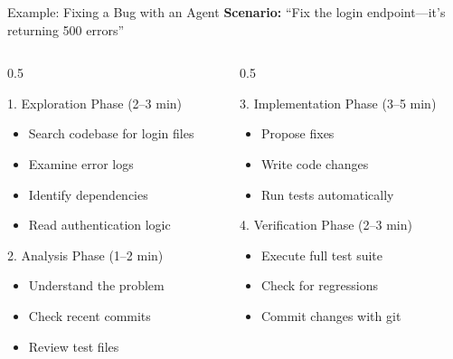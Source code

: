 \documentclass[aspectratio=169,11pt]{beamer}
\begin{document}
\begin{frame}{Example: Fixing a Bug with an Agent}
    \textbf{Scenario:} ``Fix the login endpoint---it's returning 500 errors''

    \vspace{0.3cm}
    \begin{columns}[T]
        \begin{column}{0.5\textwidth}
            \begin{block}{1. Exploration Phase (2--3 min)}
                \begin{itemize}
                    \item Search codebase for login files
                    \item Examine error logs
                    \item Identify dependencies
                    \item Read authentication logic
                \end{itemize}
            \end{block}

            \begin{block}{2. Analysis Phase (1--2 min)}
                \begin{itemize}
                    \item Understand the problem
                    \item Check recent commits
                    \item Review test files
                \end{itemize}
            \end{block}
        \end{column}
        \begin{column}{0.5\textwidth}
            \begin{block}{3. Implementation Phase (3--5 min)}
                \begin{itemize}
                    \item Propose fixes
                    \item Write code changes
                    \item Run tests automatically
                \end{itemize}
            \end{block}

            \begin{block}{4. Verification Phase (2--3 min)}
                \begin{itemize}
                    \item Execute full test suite
                    \item Check for regressions
                    \item Commit changes with git
                \end{itemize}
            \end{block}
        \end{column}
    \end{columns}


\end{frame}
\end{document}
